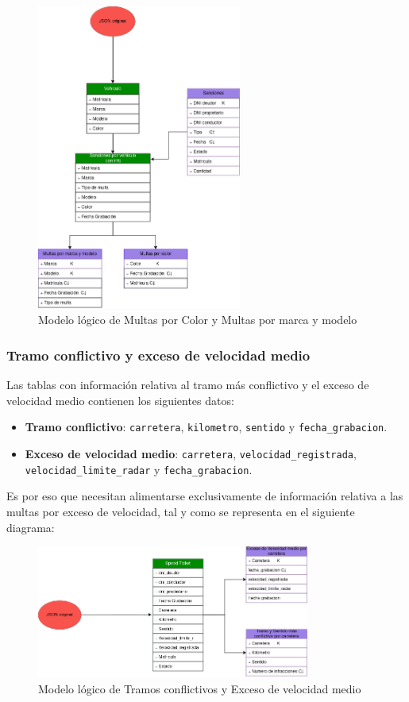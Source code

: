 \documentclass[]{article}
\begin{document}
\begin{figure}[H]
    \centering
    \includegraphics[width=0.6\textwidth]{./imagenes/multas_estadistica.png}
    \caption{Modelo lógico de Multas por Color y Multas por marca y modelo}
\end{figure}

\subsubsection{Tramo conflictivo y exceso de velocidad medio}

Las tablas con información relativa al tramo más conflictivo y el exceso de velocidad medio contienen los siguientes datos: 

\begin{itemize}
    \item\textbf{Tramo conflictivo}: \verb!carretera!, \verb!kilometro!, \verb!sentido! y \verb!fecha_grabacion!.
    \item\textbf{Exceso de velocidad medio}: \verb!carretera!, \verb!velocidad_registrada!, \verb!velocidad_limite_radar! y \verb!fecha_grabacion!.
\end{itemize}

Es por eso que necesitan alimentarse exclusivamente de información relativa a las multas por exceso de velocidad, tal y como se representa en el siguiente diagrama:

\begin{figure}[H]
    \centering
    \includegraphics[width=0.8\textwidth]{./imagenes/tramo_y_velocidad.png}
    \caption{Modelo lógico de Tramos conflictivos y Exceso de velocidad medio}
\end{figure}
\end{document}
